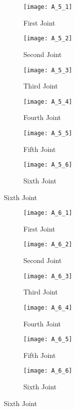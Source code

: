 \begin{figure}[H]
  \caption{External torques during high torque experiment}
  \begin{subfigure}[t]{0.5\textwidth}
    \centering
    \texttt{[image: A\_5\_1]} 
    \caption{First Joint}
  \end{subfigure}
  \begin{subfigure}[t]{0.5\textwidth}
    \centering
    \texttt{[image: A\_5\_2]}
    \caption{Second Joint}
  \end{subfigure}
  \begin{subfigure}[t]{0.5\textwidth}
    \centering
    \texttt{[image: A\_5\_3]}
    \caption{Third Joint}
  \end{subfigure}
  \begin{subfigure}[t]{0.5\textwidth}
    \centering
    \texttt{[image: A\_5\_4]}
    \caption{Fourth Joint}
  \end{subfigure}
  \begin{subfigure}[t]{0.5\textwidth}
    \centering
    \texttt{[image: A\_5\_5]}
    \caption{Fifth Joint}
  \end{subfigure}
  \begin{subfigure}[t]{0.5\textwidth}
    \centering
    \texttt{[image: A\_5\_6]}
    \caption{Sixth Joint}
  \end{subfigure}
\end{figure}


\begin{figure}[H]
  \caption{Denso Gain Identification}
  \begin{subfigure}[t]{0.5\textwidth}
    \centering
    \texttt{[image: A\_6\_1]} 
    \caption{First Joint}
  \end{subfigure}
  \begin{subfigure}[t]{0.5\textwidth}
    \centering
    \texttt{[image: A\_6\_2]}
    \caption{Second Joint}
  \end{subfigure}
  \begin{subfigure}[t]{0.5\textwidth}
    \centering
    \texttt{[image: A\_6\_3]}
    \caption{Third Joint}
  \end{subfigure}
  \begin{subfigure}[t]{0.5\textwidth}
    \centering
    \texttt{[image: A\_6\_4]}
    \caption{Fourth Joint}
  \end{subfigure}
  \begin{subfigure}[t]{0.5\textwidth}
    \centering
    \texttt{[image: A\_6\_5]}
    \caption{Fifth Joint}
  \end{subfigure}
  \begin{subfigure}[t]{0.5\textwidth}
    \centering
    \texttt{[image: A\_6\_6]}
    \caption{Sixth Joint}
    \label{fig:denso gain sixth joint}
  \end{subfigure}
\end{figure}


